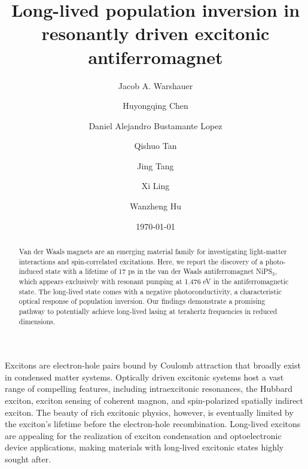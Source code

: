 \documentclass[
 reprint,
superscriptaddress,

 amsmath,amssymb,
 aps,

]{revtex4-2}
\begin{document}

\title{Long-lived population inversion in resonantly driven excitonic antiferromagnet}

\author{Jacob A. Warshauer}
\author{Huyongqing Chen}
\author{Daniel Alejandro Bustamante Lopez}
\author{Qishuo Tan}
\author{Jing Tang}
\author{Xi Ling}
\author{Wanzheng Hu}

\date{\today}

\begin{abstract}
Van der Waals magnets are an emerging material family for investigating light-matter interactions and spin-correlated excitations. Here, we report the discovery of a photo-induced state with a lifetime of 17 ps in the van der Waals antiferromagnet NiPS$_3$, which appears exclusively with resonant pumping at 1.476 eV in the antiferromagnetic state. The long-lived state comes with a negative photoconductivity, a characteristic optical response of population inversion. Our findings demonstrate a promising pathway to  potentially achieve long-lived lasing at terahertz frequencies in reduced dimensions.
\end{abstract}

\maketitle
Excitons are electron-hole pairs bound by Coulomb attraction that broadly exist in condensed matter systems. Optically driven excitonic systems host a vast range of compelling features, including intraexcitonic resonances\cite{Kaindl2003}, the Hubbard exciton\cite{Mehio2023}, exciton sensing of coherent magnon\cite{Bae2022}, and spin-polarized spatially indirect exciton\cite{Mori2023}. The beauty of rich excitonic physics, however, is eventually limited by the exciton's lifetime before the electron-hole recombination. Long-lived excitons are appealing for the realization of exciton condensation\cite{Eisenstein2014,Kogar2017,Haque2024} and optoelectronic device applications\cite{Mak2016}, making materials with long-lived excitonic states highly sought after.
\end{document}
